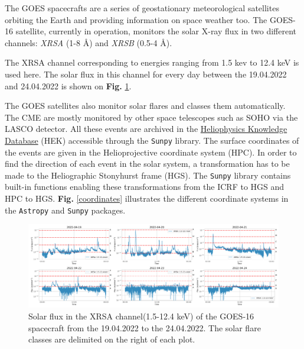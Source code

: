     The GOES spacecrafts are a series of geostationary meteorological satellites orbiting the Earth and providing information on space weather too. The GOES-16 satellite, currently in operation, monitors the solar X-ray flux in two different channels: \textit{XRSA} (1-8 \AA) and \textit{XRSB} (0.5-4 \AA). 

    The XRSA channel corresponding to energies ranging from 1.5 kev to 12.4 keV is used here. The solar flux in this channel for every day between the 19.04.2022 and 24.04.2022 is shown on \textbf{Fig.} \ref{goes_tot}.

    The GOES satellites also monitor solar flares and classes them automatically. The CME are mostly monitored by other space telescopes such as SOHO via the LASCO detector. All these events are archived in the \href{https://docs.sunpy.org/en/stable/generated/api/sunpy.net.hek.HEKClient.html}{Heliophysics Knowledge Database} (HEK) accessible through the \texttt{Sunpy} library. The surface coordinates of the events are given in the Helioprojective coordinate system (HPC). In order to find the direction of each event in the solar system, a transformation has to be made to the Heliographic Stonyhurst frame  (HGS). The \texttt{Sunpy} library contains built-in functions enabling these transformations from the ICRF to HGS and HPC to HGS. \textbf{Fig.} \ref{coordinates} illustrates the different coordinate systems in the \texttt{Astropy} and \texttt{Sunpy} packages.

    \begin{figure}[H]
        \centering
        \includegraphics[width = \textwidth]{report/Figures/methods/GOES_total.png}
        \caption{Solar flux in the XRSA channel(1.5-12.4 keV) of the GOES-16 spacecraft from the 19.04.2022 to the 24.04.2022. The solar flare classes are delimited on the right of each plot.}
        \label{goes_tot}  
    \end{figure}
    
